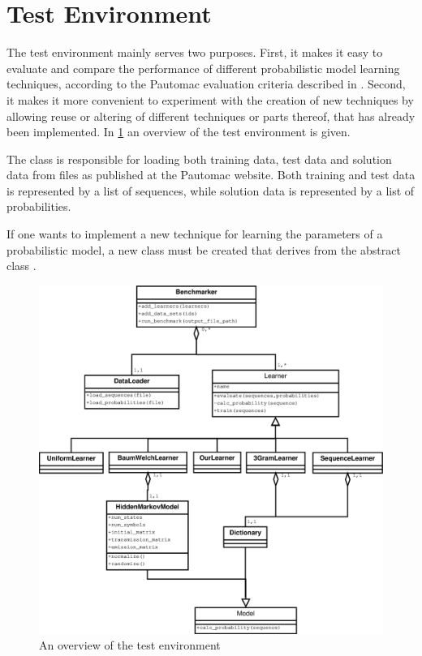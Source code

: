 \section{Test Environment}

The test environment mainly serves two purposes. First, it makes it easy to evaluate and compare the performance of different probabilistic model learning techniques, according to the Pautomac evaluation criteria described in .
Second, it makes it more convenient to experiment with the creation of new techniques by allowing reuse or altering of different techniques or parts thereof, that has already been implemented. In \ref{fig:testenvironment} an overview of the test environment is given.

The  class is responsible for loading both training data, test data and solution data from files as published at the Pautomac website. Both training and test data is represented by a list of sequences, while solution data is represented by a list of probabilities.

If one wants to implement a new technique for learning the parameters of a probabilistic model, a new class must be created that derives from the abstract class . 

\begin{figure}[!htb]
\centering
\includegraphics[scale=.4]{pictures/test-environment-overview.eps}
\caption{An overview of the test environment}
\label{fig:testenvironment}
\end{figure}

